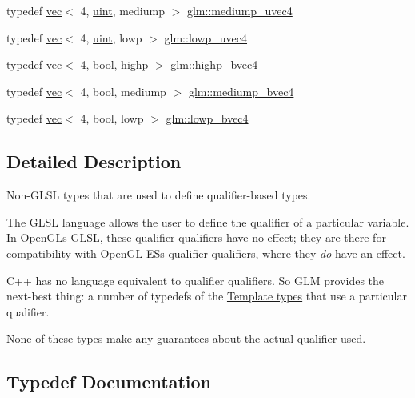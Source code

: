 \begin{DoxyCompactItemize}
\item 
typedef \hyperlink{structglm_1_1vec}{vec}$<$ 4, \hyperlink{group__core__precision_ga4fd29415871152bfb5abd588334147c8}{uint}, mediump $>$ \hyperlink{group__core__precision_ga204494f26e258e26882acf5288415ebd}{glm\+::mediump\+\_\+uvec4}
\item 
typedef \hyperlink{structglm_1_1vec}{vec}$<$ 4, \hyperlink{group__core__precision_ga4fd29415871152bfb5abd588334147c8}{uint}, lowp $>$ \hyperlink{group__core__precision_ga0ecd5668a8e001e14a9dab2cffd09285}{glm\+::lowp\+\_\+uvec4}
\item 
typedef \hyperlink{structglm_1_1vec}{vec}$<$ 4, bool, highp $>$ \hyperlink{group__core__precision_gaa99e0301060bf06e7750c1c3591b6b4e}{glm\+::highp\+\_\+bvec4}
\item 
typedef \hyperlink{structglm_1_1vec}{vec}$<$ 4, bool, mediump $>$ \hyperlink{group__core__precision_ga064ca037c066a4d47ab6d34c2cf0ae2f}{glm\+::mediump\+\_\+bvec4}
\item 
typedef \hyperlink{structglm_1_1vec}{vec}$<$ 4, bool, lowp $>$ \hyperlink{group__core__precision_ga9c156bdb6dd02d35826ee77094ff3cdf}{glm\+::lowp\+\_\+bvec4}
\end{DoxyCompactItemize}


\subsection{Detailed Description}
Non-\/\+G\+L\+SL types that are used to define qualifier-\/based types. 

The G\+L\+SL language allows the user to define the qualifier of a particular variable. In Open\+GL\textquotesingle{}s G\+L\+SL, these qualifier qualifiers have no effect; they are there for compatibility with Open\+GL ES\textquotesingle{}s qualifier qualifiers, where they {\itshape do} have an effect.

C++ has no language equivalent to qualifier qualifiers. So G\+LM provides the next-\/best thing\+: a number of typedefs of the \hyperlink{group__core__template}{Template types} that use a particular qualifier.

None of these types make any guarantees about the actual qualifier used. 

\subsection{Typedef Documentation}
\mbox{\label{group__core__precision_gad8f63e4c7546320f6b72808fadfda3c2}} 
